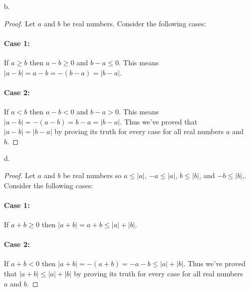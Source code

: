 \documentclass[11pt]{amsart}
\theoremstyle{definition}
\begin{document}
\begin{itemize}
\begin{itemize}
\begin{proof}
        \paragraph{Case 3:}
            If $a< 0$ and $b\ge 0$ then $|a|=-a$and $|b|=b$. Then $|ab|=-(ab)=(-a)b=|a||b|$.
        \paragraph{Case 4:}
            If $a< 0$ and $b< 0$ then $|a|=-a$and $|b|=-b$. Then $|ab|=ab=(-a)(-b)=|a||b|$. \\
        Thus we've proved that $|ab|=|a||b|$ by proving its truth for every case for all real numbers $a$ and $b$.
    \end{proof}

    \item[b.] \begin{proof}
        Let $a$ and $b$ be real numbers. Consider the following cases:
        \paragraph{Case 1:}
            If $a\ge b$ then $a-b\ge 0$ and $b-a\le 0$. This means $|a-b|=a-b=-(b-a)=|b-a|$.
        \paragraph{Case 2:}
            If $a<b$ then $a-b<0$ and $b-a> 0$. This means $|a-b|=-(a-b)=b-a=|b-a|$.
        Thus we've proved that $|a-b|=|b-a|$ by proving its truth for every case for all real numbers $a$ and $b$.
    \end{proof}
        
    \item[d.] \begin{proof}
        Let $a$ and $b$ be real numbers so $a\le |a|$, $-a\le |a|$, $b\le |b|$, and $-b\le |b|$,. Consider the following cases:
        \paragraph{Case 1:}
            If $a+b\ge 0$ then $|a+b|=a+b\le |a|+|b|$.
        \paragraph{Case 2:}
            If $a+b< 0$ then $|a+b|=-(a+b)=-a-b\le |a|+|b|$.
        Thus we've proved that $|a+b|\le|a|+|b|$ by proving its truth for every case for all real numbers $a$ and $b$.
    \end{proof}


\end{itemize}
\end{itemize}
\end{document}
